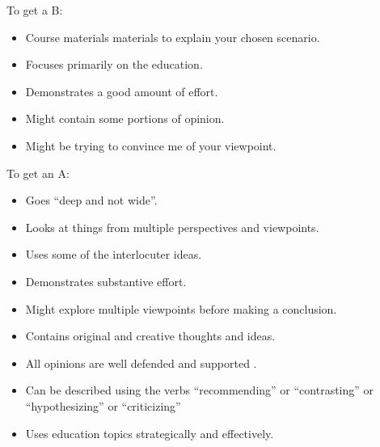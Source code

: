 \documentclass[11pt]{article}
\theoremstyle{theorem}\newtheorem*{task}{Task}
\theoremstyle{theorem}\newtheorem*{example}{Example}
\theoremstyle{theorem}\newtheorem*{answer}{Answer}
\theoremstyle{definition}\newtheorem*{solution}{Solution}
\theoremstyle{theorem}\newtheorem*{prompt}{Prompt}
\theoremstyle{theorem}\newtheorem*{question}{Question}
\begin{document}
To get a B:
\begin{itemize}
    \item Course materials materials to explain your chosen scenario.
    \item Focuses primarily on the education.
    \item Demonstrates a good amount of effort.
    \item Might contain some portions of opinion.
    \item Might be trying to convince me of your viewpoint.
\end{itemize}

To get an A:
\begin{itemize}
    \item Goes ``deep and not wide''.
    \item Looks at things from multiple perspectives and viewpoints.
    \item Uses some of the interlocuter ideas.
    \item Demonstrates substantive effort.
    \item Might explore multiple viewpoints before making a conclusion.
    \item Contains original and creative thoughts and ideas.
    \item All opinions are well defended and supported .
    \item Can be described using the verbs ``recommending'' or ``contrasting'' or ``hypothesizing'' or ``criticizing''
    \item Uses education topics strategically and effectively.
\end{itemize}
\end{document}
